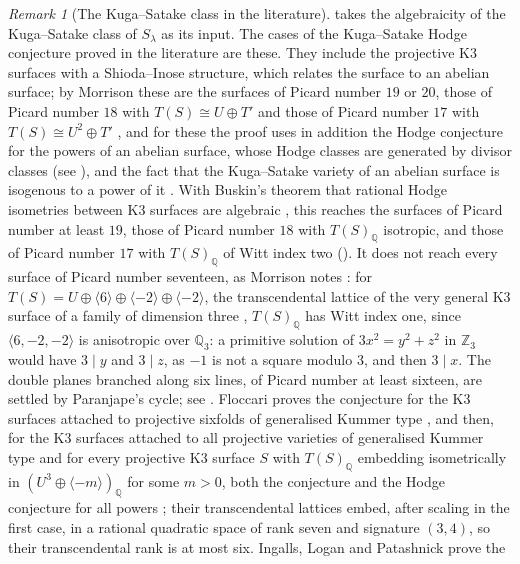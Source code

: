 \documentclass[11pt,reqno]{amsart}
\theoremstyle{plain}
\theoremstyle{definition}
\theoremstyle{remark}
\newtheorem{remark}[theorem]{Remark}
\newcommand{\QQ}{\mathbb{Q}}
\newcommand{\ZZ}{\mathbb{Z}}
\begin{document}
\begin{remark}[The Kuga--Satake class in the literature]
\label{rem:mumfordks}
 takes the algebraicity of the Kuga--Satake class of
$S_{\lambda}$ as its input. The cases of the Kuga--Satake Hodge conjecture
proved in the literature are these. They include the projective K3 surfaces with
a Shioda--Inose structure, which relates the surface to an abelian surface;
by Morrison these are the surfaces of Picard number $19$ or $20$, those of
Picard number $18$ with $T(S)\cong U\oplus T'$ and those of Picard number
$17$ with $T(S)\cong U^{2}\oplus T'$
\cite[Theorem~6.3 and Corollary~6.4]{Mor84}, and for these the proof uses in
addition the Hodge conjecture for the powers of an abelian surface, whose
Hodge classes are generated by divisor classes (see \cite{MZ99}), and the
fact that the Kuga--Satake variety of an abelian surface is isogenous to a
power of it \cite{Mor85}. With Buskin's theorem that rational Hodge
isometries between K3 surfaces are algebraic \cite{Bus19}, this reaches the
surfaces of Picard number at least $19$, those of Picard number $18$ with
$T(S)_{\QQ}$ isotropic, and those of Picard number $17$ with $T(S)_{\QQ}$ of
Witt index two (). It does not reach every
surface of Picard number seventeen, as Morrison notes
\cite[Remark~7.2]{Mor84}: for
$T(S)=U\oplus\langle6\rangle\oplus\langle-2\rangle\oplus\langle-2\rangle$,
the transcendental lattice of the very general K3 surface of a family of
dimension three \cite[Corollary~2.10]{Mor84}, $T(S)_{\QQ}$ has Witt index one,
since $\langle6,-2,-2\rangle$ is anisotropic over $\QQ_{3}$: a primitive
solution of $3x^{2}=y^{2}+z^{2}$ in $\ZZ_{3}$ would have $3\mid y$ and
$3\mid z$, as $-1$ is not a square modulo $3$, and then $3\mid x$. The double planes branched along six lines, of Picard
number at least sixteen, are settled by Paranjape's cycle; see \cite{vG00}.
Floccari proves the conjecture for the K3 surfaces attached to projective
sixfolds of generalised Kummer type \cite{Flo24}, and then, for the K3
surfaces attached to all projective varieties of generalised Kummer type and
for every projective K3 surface $S$ with $T(S)_{\QQ}$ embedding isometrically
in $(U^{3}\oplus\langle-m\rangle)_{\QQ}$ for some $m>0$, both the conjecture
and the Hodge conjecture for all powers \cite[Theorems~1.2 and~5.11]{Flo25};
their transcendental lattices embed, after scaling in the first case, in a
rational quadratic space of rank seven and signature $(3,4)$, so their
transcendental rank is at most six. Ingalls, Logan and Patashnick prove the

\end{remark}
\end{document}
